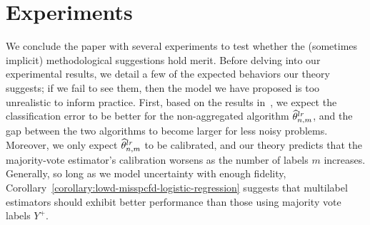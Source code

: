 \documentclass[11pt]{article}
\newcommand{\ha}[1]{\textcolor{ha}{[HA: #1]}}
\newcommand{\what}[1]{\widehat{#1}}
\newcommand{\majY}{Y^+}
\newcommand{\lr}{^{\textup{lr}}}
\newcommand{\<}{\langle} %
\renewcommand{\>}{\rangle}
\newcommand{\tmle}{\what{\theta}\lr_{n,m}} %
\begin{document}

\newcommand{\logit}{\mathop{\rm logit}}

\section{Experiments}
\label{sec:experiments}



We conclude the paper with several experiments to 
test whether the (sometimes implicit)
methodological suggestions hold merit.  Before delving into our experimental
results, we detail a few of the expected behaviors our theory suggests; if
we fail to see them, then the model we have proposed is too unrealistic to
inform practice.  First, based on the results
in~, we expect the classification error to be
better for the non-aggregated algorithm $\tmle$, and the gap between the two
algorithms to become larger for less noisy problems. Moreover, we only
expect $\tmle$ to be calibrated, and our theory predicts that the
majority-vote estimator's calibration worsens as the number of labels $m$
increases. Generally,
so long as we model uncertainty with enough fidelity,
Corollary~\ref{corollary:lowd-misspcfd-logistic-regression} suggests
that multilabel estimators should exhibit better performance than
those using majority vote labels $\majY$.
\end{document}
